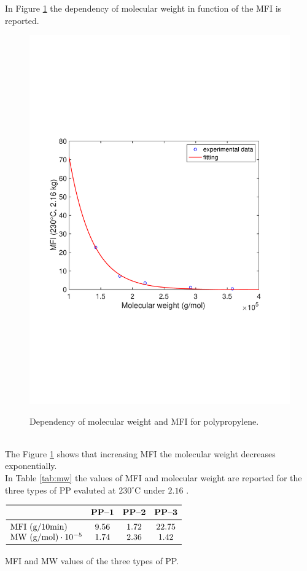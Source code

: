 \documentclass[a4paper, 11pt]{article}
\begin{document}
In Figure \ref{fig:mw} the dependency of molecular weight in function of the MFI is reported.
\begin{figure}[h!]
	\centering
	{\includegraphics[scale=0.4]{mw}}
	\captionsetup{justification=centering}
	\caption{Dependency of molecular weight and MFI for polypropylene.}
	\label{fig:mw}
\end{figure}\\
The Figure \ref{fig:mw} shows that increasing MFI the molecular weight decreases exponentially.\\ In Table \ref{tab:mw} the values of MFI and molecular weight are reported for the three types of PP evaluted at $230 ^\circ$C under $2.16$ .
\begin{table}[htp]
\centering
$
\begin{array}{lccc}
\toprule
\text{} & \textbf{PP–1} & \textbf{PP–2} & \textbf{PP–3} \\
\midrule
\text{MFI (g/10min)} & 9.56 & 1.72 & 22.75  \\
\text{MW (g/mol)}\cdot 10^{-5} & 1.74 & 2.36 & 1.42 \\
\bottomrule
\end{array}
$
\caption{MFI and MW values of the three types of PP.}
\label{tab:mw}
\end{table}
\end{document}
